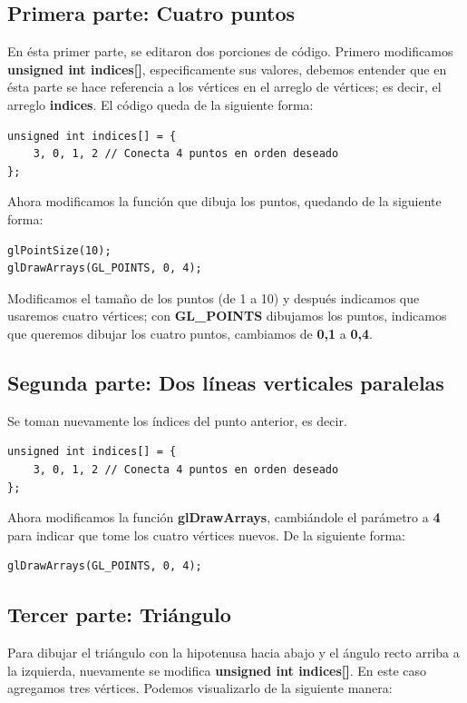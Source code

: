 \documentclass[a4paper,11pt]{article}                 %
\begin{document}
\subsection{Primera parte: Cuatro puntos}
En ésta primer parte, se editaron dos porciones de código. Primero modificamos \textbf{unsigned int indices[]}, especificamente sus valores, debemos entender que en ésta parte se hace referencia a los vértices en el arreglo de vértices; es decir, el arreglo \textbf{indices}. El código queda de la siguiente forma:

\begin{lstlisting}[style=cppstyle]
unsigned int indices[] = {
    3, 0, 1, 2 // Conecta 4 puntos en orden deseado
};
\end{lstlisting}

Ahora modificamos la función que dibuja los puntos, quedando de la siguiente forma:
\begin{lstlisting}[style=cppstyle]
glPointSize(10);
glDrawArrays(GL_POINTS, 0, 4);
\end{lstlisting}

Modificamos el tamaño de los puntos (de 1 a 10) y después indicamos que usaremos cuatro vértices; con \textbf{GL\_POINTS} dibujamos los puntos, indicamos que queremos dibujar los cuatro puntos, cambiamos de \textbf{0,1} a \textbf{0,4}.


\subsection{Segunda parte: Dos líneas verticales paralelas}
Se toman nuevamente los índices del punto anterior, es decir.
\begin{lstlisting}[style=cppstyle]
unsigned int indices[] = {
    3, 0, 1, 2 // Conecta 4 puntos en orden deseado
};
\end{lstlisting}

Ahora modificamos la función \textbf{glDrawArrays}, cambiándole el parámetro a \textbf{4} para indicar que tome los cuatro vértices nuevos. De la siguiente forma:
\begin{lstlisting}[style=cppstyle]
glDrawArrays(GL_POINTS, 0, 4);
\end{lstlisting}

\subsection{Tercer parte: Triángulo}
Para dibujar el triángulo con la hipotenusa hacia abajo y el ángulo recto arriba a la izquierda, nuevamente se modifica \textbf{unsigned int indices[]}. En este caso agregamos tres vértices.
Podemos visualizarlo de la siguiente manera:
\end{document}
